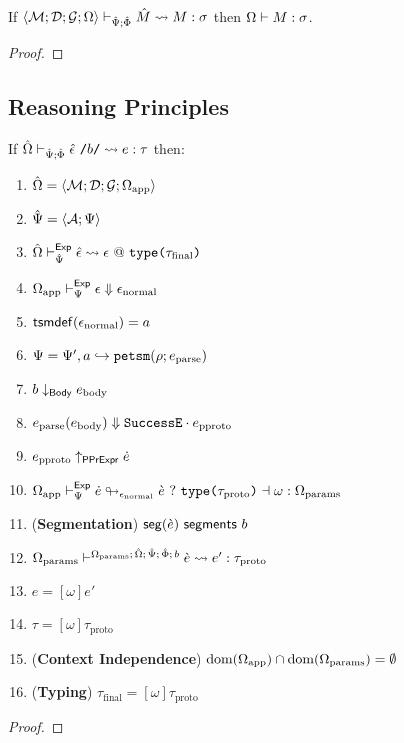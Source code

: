 \begin{theorem}
\label{thm:module-expansion-P}
If $\langle \mathcal{M}; \mathcal{D}; \mathcal{G}; \Omega \rangle \vdash_{\hat{\Psi}; \hat\Phi} {\hat M} \leadsto M : \sigma$ then $\Omega \vdash M : \sigma$.
\end{theorem}
\begin{proof}  \end{proof}

\subsection{Reasoning Principles}

\begin{theorem}
\label{thm:petsm-reasoning-principles}
If ${\hat\Omega} \vdash_{\hat{\Psi}; \hat\Phi} {\hat\epsilon}~\texttt{/}b\texttt{/} \leadsto e : \tau$ then:
\begin{enumerate}
  \item ${\hat\Omega} = \langle \mathcal{M}; \mathcal{D}; \mathcal{G}; \Omega_\text{app} \rangle$
  \item $\hat{\Psi}=\langle \mathcal{A}; \Psi \rangle$
  \item ${\hat\Omega} \vdash_{\hat{\Psi}}^{\mathsf{Exp}} {\hat\epsilon} \leadsto \epsilon~@~\texttt{type}\texttt{(}\tau_\text{final}\texttt{)}$
  \item $\Omega_\text{app} \vdash_{\Psi}^\mathsf{Exp} \epsilon \Downarrow \epsilon_\text{normal}$
  \item $\mathsf{tsmdef}(\epsilon_\text{normal})=a$
  \item $\Psi = \Psi', a \hookrightarrow \texttt{petsm}(\rho; e_\text{parse})$
  \item $b \downarrow_\mathsf{Body} e_\text{body}$
  \item $e_\text{parse}(e_\text{body}) \Downarrow {\mathtt{SuccessE}}\cdot{e_\text{pproto}}$
  \item $e_\text{pproto} \uparrow_\mathsf{PPrExpr} \dot{e}$
  \item $\Omega_\text{app} \vdash_{\Psi}^\mathsf{Exp} \dot{e} \looparrowright_{\epsilon_\text{normal}} \grave{e} ~?~ \texttt{type}\texttt{(}\tau_\text{proto}\texttt{)} \dashv \omega : \Omega_\text{params}$
  \item (\textbf{Segmentation}) $\mathsf{seg}(\grave{e})~\mathsf{segments}~b$
  \item $\Omega_\text{params} \vdash^{\Omega_\text{params};\,{\hat\Omega};\,\hat{\Psi};\,\hat\Phi;\,b} \grave{e} \leadsto e' : \tau_\text{proto}$
  \item $e = [\omega]e'$
  \item $\tau = [\omega]\tau_\text{proto}$
  \item (\textbf{Context Independence}) $\text{dom}(\Omega_\text{app}) \cap \text{dom}(\Omega_\text{params}) = \emptyset$
  \item (\textbf{Typing}) $\tau_\text{final} = [\omega]\tau_\text{proto}$
\end{enumerate}
\end{theorem}
\begin{proof}  \end{proof}

